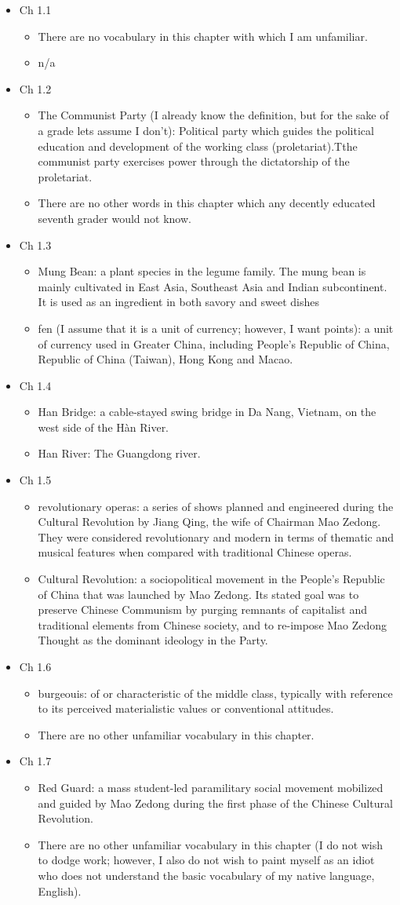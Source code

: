 \documentclass[12pt]{article}
\newcommand{\vc}[4]{
  \item Ch #1.#2
  \begin{itemize}
    \item #3
    \item #4
  \end{itemize}
}
\begin{document}
\vspace{2em}
\begin{itemize}

  \vc{1}{1}{There are no vocabulary in this chapter with which I am unfamiliar.}{n/a}

  \vc{1}{2}{The Communist Party (I already know the definition, but for the sake of a grade lets assume I don't): Political party which guides the political education and development of the working class (proletariat).Tthe communist party exercises power through the dictatorship of the proletariat.}{There are no other words in this chapter which any decently educated seventh grader would not know.}

  \vc{1}{3}{Mung Bean: a plant species in the legume family. The mung bean is mainly cultivated in East Asia, Southeast Asia and Indian subcontinent. It is used as an ingredient in both savory and sweet dishes}{fen (I assume that it is a unit of currency; however, I want points): a unit of currency used in Greater China, including People's Republic of China, Republic of China (Taiwan), Hong Kong and Macao.}

  \vc{1}{4}{Han Bridge: a cable-stayed swing bridge in Da Nang, Vietnam, on the west side of the Hàn River.}{Han River: The Guangdong river.}

  \vc{1}{5}{revolutionary operas: a series of shows planned and engineered during the Cultural Revolution by Jiang Qing, the wife of Chairman Mao Zedong. They were considered revolutionary and modern in terms of thematic and musical features when compared with traditional Chinese operas.}{Cultural Revolution: a sociopolitical movement in the People's Republic of China that was launched by Mao Zedong. Its stated goal was to preserve Chinese Communism by purging remnants of capitalist and traditional elements from Chinese society, and to re-impose Mao Zedong Thought as the dominant ideology in the Party.}

  \vc{1}{6}{burgeouis: of or characteristic of the middle class, typically with reference to its perceived materialistic values or conventional attitudes.}{There are no other unfamiliar vocabulary in this chapter.}

  \vc{1}{7}{Red Guard: a mass student-led paramilitary social movement mobilized and guided by Mao Zedong during the first phase of the Chinese Cultural Revolution.}{There are no other unfamiliar vocabulary in this chapter (I do not wish to dodge work; however, I also do not wish to paint myself as an idiot who does not understand the basic vocabulary of my native language, English).}


\end{itemize}
\end{document}
